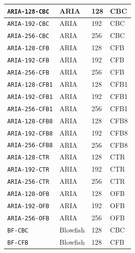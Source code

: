 \documentclass[synpaper]{book}
\begin{document}
\begin{table}[H]
\begin{small}
\begin{tabular}{|l|l|l|l|}
\hline \texttt{ARIA-128-CBC}      & ARIA            & 128                       & CBC    \\
\hline \texttt{ARIA-192-CBC}      & ARIA            & 192                       & CBC    \\
\hline \texttt{ARIA-256-CBC}      & ARIA            & 256                       & CBC    \\
\hline \texttt{ARIA-128-CFB}      & ARIA            & 128                       & CFB    \\
\hline \texttt{ARIA-192-CFB}      & ARIA            & 192                       & CFB    \\
\hline \texttt{ARIA-256-CFB}      & ARIA            & 256                       & CFB    \\
\hline \texttt{ARIA-128-CFB1}     & ARIA            & 128                       & CFB1   \\
\hline \texttt{ARIA-192-CFB1}     & ARIA            & 192                       & CFB1   \\
\hline \texttt{ARIA-256-CFB1}     & ARIA            & 256                       & CFB1   \\
\hline \texttt{ARIA-128-CFB8}     & ARIA            & 128                       & CFB8   \\
\hline \texttt{ARIA-192-CFB8}     & ARIA            & 192                       & CFB8   \\
\hline \texttt{ARIA-256-CFB8}     & ARIA            & 256                       & CFB8   \\
\hline \texttt{ARIA-128-CTR}      & ARIA            & 128                       & CTR    \\
\hline \texttt{ARIA-192-CTR}      & ARIA            & 192                       & CTR    \\
\hline \texttt{ARIA-256-CTR}      & ARIA            & 256                       & CTR    \\
\hline \texttt{ARIA-128-OFB}      & ARIA            & 128                       & OFB    \\
\hline \texttt{ARIA-192-OFB}      & ARIA            & 192                       & OFB    \\
\hline \texttt{ARIA-256-OFB}      & ARIA            & 256                       & OFB    \\
\hline \texttt{BF-CBC}            & Blowfish        & 128                       & CBC    \\
\hline \texttt{BF-CFB}            & Blowfish        & 128                       & CFB    \\

\end{tabular}
\end{small}
\end{table}
\end{document}
